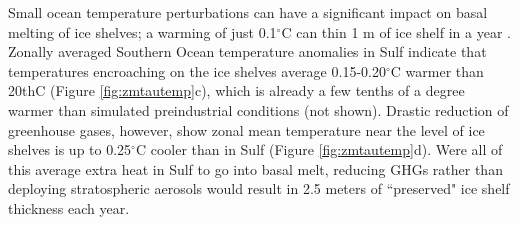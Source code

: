 \documentclass[draft,grl]{AGUTeX}  %
\begin{document}
\begin{article}


Small ocean temperature perturbations can have a significant impact on basal melting of ice shelves; a warming of just 0.1$^\circ$C can thin 1 m of ice shelf in a year \citep{rignot02}. Zonally averaged Southern Ocean temperature anomalies in Sulf indicate that temperatures encroaching on the ice shelves average 0.15-0.20$^\circ$C warmer than 20thC (Figure \ref{fig:zmtautemp}c), which is already a few tenths of a degree warmer than simulated preindustrial conditions (not shown). Drastic reduction of greenhouse gases, however, show zonal mean temperature near the level of ice shelves is up to 0.25$^\circ$C cooler than in Sulf (Figure \ref{fig:zmtautemp}d). Were all of this average extra heat in Sulf to go into basal melt, reducing GHGs rather than deploying stratospheric aerosols would result in 2.5 meters of ``preserved" ice shelf thickness each year. 


\end{article}
\end{document}
